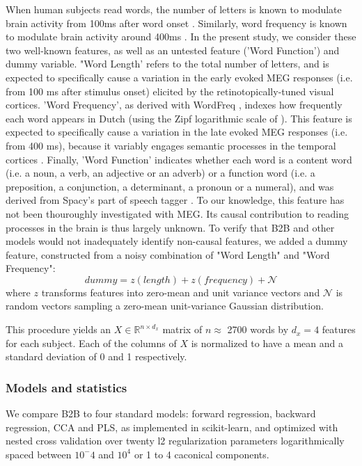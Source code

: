 When human subjects read words, the number of letters is known to modulate
brain activity from 100ms after word onset \citep{pegado2014timing}.
Similarly, word frequency is known to modulate brain activity around 400ms
\citep{kutas2011thirty}. In the present study, we consider these two well-known features, as well as an untested feature ('Word Function') and dummy variable.
%
"Word Length' refers to the total number of letters, and is expected to specifically cause a variation in the early evoked MEG responses (i.e. from 100 ms after stimulus onset) elicited by the retinotopically-tuned visual cortices.
%
'Word Frequency', as derived with WordFreq \citep{speerwordfreq}, indexes how frequently each word appears in Dutch (using the Zipf logarithmic scale of \citep{van2014subtlex}). This feature is expected to specifically cause a variation in the late evoked MEG responses (i.e. from 400 ms), because it variably engages semantic processes in the temporal cortices \citep{kutas2011thirty}.
%
Finally, 'Word Function' indicates whether each word is a content word (i.e. a noun, a verb, an adjective or an adverb) or a function word (i.e. a preposition, a conjunction, a determinant, a pronoun or a numeral), and was derived from Spacy's part of speech tagger \citep{spacy2}. To our knowledge, this feature has not been thouroughly investigated with MEG. Its causal contribution to reading processes in the brain is thus largely unknown.
%
To verify that B2B and other models would not inadequately identify non-causal features, we added a dummy feature, constructed from a noisy combination of "Word Length" and "Word Frequency":
\begin{equation}
  dummy = z(length) + z(frequency) + \mathcal{N}
\end{equation}
where $z$ transforms features into zero-mean and unit variance vectors and $\mathcal{N}$ is random vectors sampling a zero-mean unit-variance Gaussian distribution.

This procedure yields an $X \in \mathbb{R}^{n \times d_x}$ matrix of $n\approx$ 2700 words by
$d_x=4$ features for each subject. Each of the columns of $X$ is normalized to
have a mean and a standard deviation of 0 and 1 respectively.

\subsubsection{Models and statistics}

We compare B2B to four standard models: forward regression, backward regression, CCA and PLS, as implemented in scikit-learn, and optimized with nested cross validation over twenty l2 regularization parameters logarithmically spaced between $10^-4$ and $10^4$ or 1 to 4 caconical components.

